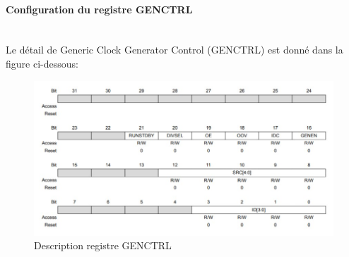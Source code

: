 \documentclass[a4paper]{article}
\begin{document}
	\newpage
	\paragraph{Configuration du registre GENCTRL} 
	~~\\
	Le détail de Generic Clock Generator Control (GENCTRL) est donné dans la figure ci-dessous:\\
	\begin{figure}[H]
		\centering
		\includegraphics[width=12cm]{GENCTRL.jpg}
		\caption{Description registre GENCTRL}
	\end{figure}
	
\end{document}
